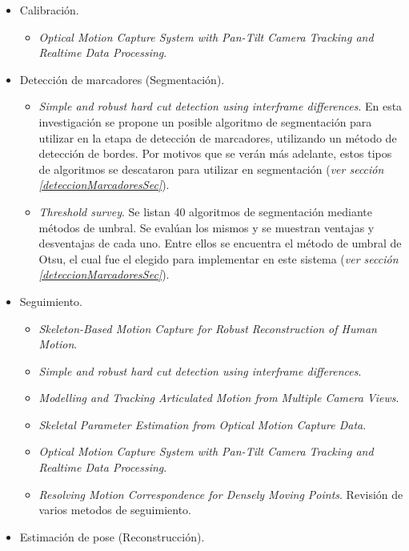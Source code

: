 \begin{itemize}
	\item Calibración.
	\begin{itemize}
		\item \emph{Optical Motion Capture System with Pan-Tilt Camera Tracking and Realtime Data Processing}.
	\end{itemize}
	\item Detección de marcadores (Segmentación).
	\begin{itemize}
		\item \emph{Simple and robust hard cut detection using interframe differences}\cite{pardo2005simple}. En esta investigación se propone un posible algoritmo de segmentación para utilizar en la etapa de detección de marcadores, utilizando un método de detección de bordes. Por motivos que se verán más adelante, estos tipos de algoritmos se descataron para utilizar en segmentación (\textit{ver sección \ref{deteccionMarcadoresSec}}).
		\item \emph{Threshold survey}\cite{surveyThreshold}. Se listan 40 algoritmos de segmentación mediante métodos de umbral. Se evalúan los mismos y se muestran ventajas y desventajas de cada uno. Entre ellos se encuentra el método de umbral de Otsu\cite{otsu}, el cual fue el elegido para implementar en este sistema (\textit{ver sección \ref{deteccionMarcadoresSec}}).
	\end{itemize}
	\item Seguimiento.
	\begin{itemize}
		\item \emph{Skeleton-Based Motion Capture for Robust Reconstruction of Human Motion}\cite{herda}.
		\item \emph{Simple and robust hard cut detection using interframe differences}\cite{pardo2005simple}.
		\item \emph{Modelling and Tracking Articulated Motion from Multiple Camera Views}\cite{ringer2000modelling}.
		\item \emph{Skeletal Parameter Estimation from Optical Motion Capture Data}\cite{kirk2005skeletal}.
		\item \emph{Optical Motion Capture System with Pan-Tilt Camera Tracking and  Realtime Data Processing}\cite{kurihara2002optical}.
		\item \emph{Resolving Motion Correspondence for Densely Moving Points}\cite{survey_tracking}. Revisión de varios metodos de seguimiento.
	\end{itemize}
	\item Estimación de pose (Reconstrucción).

\end{itemize}
